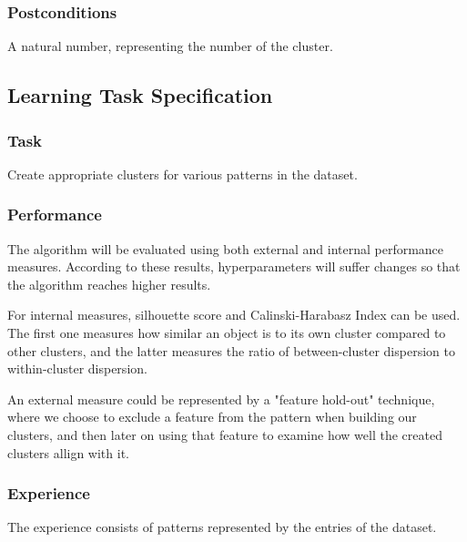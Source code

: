\documentclass[a4paper, 11pt]{article}
\begin{document}
\subsubsection*{Postconditions} 
  A natural number, representing the number of the cluster.

\subsection{Learning Task Specification}

\subsubsection*{Task}
Create appropriate clusters for various patterns in the dataset.

\subsubsection*{Performance}
The algorithm will be evaluated using both external and internal
performance measures. According to these results, hyperparameters
will suffer changes so that the algorithm reaches higher results.

For internal measures, silhouette score and Calinski-Harabasz Index
can be used. The first one measures how similar an object is to its own cluster
compared to other clusters, and the latter measures the ratio
of between-cluster dispersion to within-cluster dispersion.

An external measure could be represented by a "feature hold-out" technique,
where we choose to exclude a feature from the pattern when building our clusters,
and then later on using that feature to examine how well the created clusters
allign with it.

\subsubsection*{Experience}
The experience consists of patterns represented by the entries
of the dataset.
\end{document}
